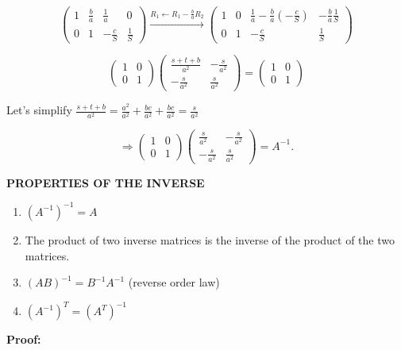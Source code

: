 \[\begin{pmatrix}
1 & \frac{b}{a} & \frac{1}{a} & 0 \\
0 & 1 & -\frac{c}{S} & \frac{1}{S}
\end{pmatrix} \xrightarrow{R_1 \leftarrow R_1 - \frac{b}{a}R_2}
\begin{pmatrix}
1 & 0 & \frac{1}{a} - \frac{b}{a}\left(-\frac{c}{S}\right) & -\frac{b}{a}\frac{1}{S} \\
0 & 1 & -\frac{c}{S} & \frac{1}{S}
\end{pmatrix}\]

\begin{equation*}
\begin{pmatrix}
1 & 0 \\
0 & 1
\end{pmatrix}
\begin{pmatrix}
\frac{s+t+b}{a^2} & -\frac{s}{a^2} \\
-\frac{s}{a^2} & \frac{s}{a^2}
\end{pmatrix}
=
\begin{pmatrix}
1 & 0 \\
0 & 1
\end{pmatrix}
\end{equation*}

Let's simplify $\frac{s+t+b}{a^2} = \frac{a^2}{a^2} + \frac{bc}{a^2} + \frac{bc}{a^2} = \frac{s}{a^2}$

\begin{equation*}
\Rightarrow
\begin{pmatrix}
1 & 0 \\
0 & 1
\end{pmatrix}
\begin{pmatrix}
\frac{s}{a^2} & -\frac{s}{a^2} \\
-\frac{s}{a^2} & \frac{s}{a^2}
\end{pmatrix}
= A^{-1}.
\end{equation*}

\textbf{PROPERTIES OF THE INVERSE}

\begin{enumerate}
\item $(A^{-1})^{-1} = A$
\item The product of two inverse matrices is the inverse of the product of the two matrices.
\item $(AB)^{-1} = B^{-1}A^{-1}$ \quad (reverse order law)
\item $(A^{-1})^T = (A^T)^{-1}$
\end{enumerate}

\textbf{Proof:}

